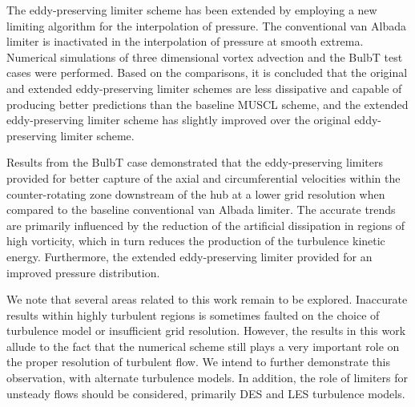 The eddy-preserving limiter scheme has been extended by employing a new limiting algorithm for the interpolation of pressure. The conventional van Albada limiter is inactivated in the interpolation of pressure at smooth extrema. Numerical simulations of three dimensional vortex advection and the BulbT test cases were performed. Based on the comparisons, it is concluded that the original and extended eddy-preserving limiter schemes are less dissipative and capable of producing better predictions than the baseline MUSCL scheme, and the extended eddy-preserving limiter scheme has slightly improved over the original eddy-preserving limiter scheme. {\color{red} Results from the BulbT case demonstrated that the eddy-preserving limiters provided for better capture of the axial and circumferential velocities within the counter-rotating zone downstream of the hub at a lower grid resolution when compared to the baseline conventional van Albada limiter. The accurate trends are primarily influenced by the reduction of the artificial dissipation in regions of high vorticity, which in turn reduces the production of the turbulence kinetic energy. Furthermore, the extended eddy-preserving limiter provided for an improved pressure distribution.

We note that several areas related to this work remain to be explored. Inaccurate results within highly turbulent regions is sometimes faulted on the choice of turbulence model or insufficient grid resolution.  However, the results in this work allude to the fact that the numerical scheme still plays a very important role on the proper resolution of turbulent flow. We intend to further demonstrate this observation, with alternate turbulence models. In addition, the role of limiters for unsteady flows should be considered, primarily DES and LES turbulence models.}